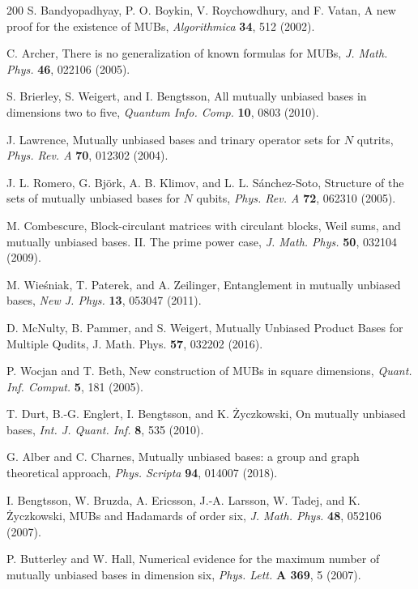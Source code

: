 \documentclass[english,aps,pra,nofootinbib,twocolumn,superscriptaddress]{revtex4-1}
\newcommand{\1}{{\rm 1\hspace{-0.9mm}l}}
\begin{document}
\begin{thebibliography}{200}
 S. Bandyopadhyay, P. O. Boykin, V. Roychowdhury, and F. Vatan, 
A new proof for the existence of MUBs,
 {\sl Algorithmica} {\bf 34}, 512 (2002).

 C. Archer, 
There is no generalization of known formulas for MUBs,
{\sl J. Math. Phys.} {\bf 46}, 022106 (2005).

 S. Brierley, S. Weigert, and I. Bengtsson, 
  All mutually unbiased bases in dimensions two to five, 
  {\sl Quantum Info.  Comp. } {\bf 10}, 0803 (2010).  
 
 J. Lawrence, Mutually unbiased bases and trinary operator sets for $N$ qutrits,
{\sl Phys. Rev. A} {\bf 70}, 012302 (2004).

 J. L. Romero, G. Bj{\"o}rk, A. B. Klimov, and L. L. S{\'a}nchez-Soto,
Structure of the sets of mutually unbiased bases for $N$ qubits,
{\sl Phys. Rev. A} {\bf 72}, 062310 (2005).
 	
 	 M. Combescure,
Block-circulant matrices with circulant blocks, Weil sums, and mutually unbiased bases. 
II. The prime power case,
{\sl J. Math. Phys.} {\bf 50}, 032104 (2009).

 M. Wie{\'s}niak,  T. Paterek, and A. Zeilinger,
Entanglement in mutually unbiased bases,
{\sl New J. Phys.} {\bf 13}, 053047 (2011).

  D. McNulty, B. Pammer, and  S. Weigert,
 Mutually Unbiased Product Bases for Multiple Qudits, 
{J. Math. Phys.} {\bf 57}, 032202 (2016).

 P. Wocjan and T. Beth, 
 New construction of MUBs in square dimensions,
{\sl Quant. Inf. Comput.} {\bf  5}, 181 (2005).

 T. Durt, B.-G. Englert, I. Bengtsson, and K. {\.Z}yczkowski, 
 On mutually unbiased bases,
 {\sl Int. J. Quant. Inf.} {\bf 8}, 535 (2010).

  G. Alber and C. Charnes,
Mutually unbiased bases: a group and graph theoretical approach,
{\sl Phys. Scripta} {\bf  94},   014007   (2018).

 I. Bengtsson, W. Bruzda, 
A. Ericsson, J.-A. Larsson, W. Tadej, and K. {\.Z}yczkowski,
MUBs and Hadamards of order six,
{\sl J. Math. Phys.} {\bf  48}, 052106 (2007).

 P. Butterley and W. Hall,
Numerical evidence for the maximum number of mutually unbiased 
bases in dimension six,
{\sl Phys. Lett.} {\bf A 369}, 5  (2007).


\end{thebibliography}
\end{document}
